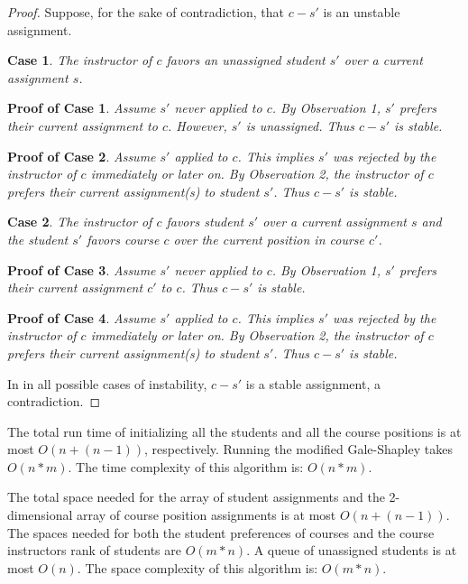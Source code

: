 \documentclass[11pt]{article}
\theoremstyle{definition}
\theoremstyle{plain}
\theoremstyle{indented-remark}
\newtheorem{case}{Case}
\theoremstyle{indented-proof}
\newtheorem*{proofofcase}{Proof of Case}
\begin{document}
\begin{proof}
Suppose, for the sake of contradiction, that $c - s'$ is an unstable assignment. 
\begin{case}
The instructor of $c$ favors an unassigned student $s'$ over a current assignment $s$.
\end{case}

\begin{proofofcase}
Assume $s'$ never applied to $c$. By Observation 1, $s'$ prefers their current assignment to $c$. However, $s'$ is unassigned. Thus $c - s'$ is stable.
\end{proofofcase}

\begin{proofofcase}
Assume $s'$ applied to $c$. This implies $s'$ was rejected by the instructor of $c$ immediately or later on. By Observation 2, the instructor of $c$ prefers their current assignment(s) to student $s'$. Thus $c - s'$ is stable.
\end{proofofcase}

\begin{case}
The instructor of $c$ favors student $s'$ over a current assignment $s$ and the student $s'$ favors course $c$ over the current position in course $c'$.
\end{case}

\begin{proofofcase}
Assume $s'$ never applied to $c$. By Observation 1, $s'$ prefers their current assignment $c'$ to $c$. Thus $c - s'$ is stable.
\end{proofofcase}

\begin{proofofcase}
Assume $s'$ applied to $c$. This implies $s'$ was rejected by the instructor of $c$ immediately or later on. By Observation 2, the instructor of $c$ prefers their current assignment(s) to student $s'$. Thus $c - s'$ is stable.
\end{proofofcase}

\noindent In in all possible cases of instability, $c - s'$ is a stable assignment, a contradiction.
\end{proof}

\noindent The total run time of initializing all the students and all the course positions is at most $O(n + (n-1))$, respectively. Running the modified Gale-Shapley takes $O(n*m)$. The time complexity of this algorithm is: $O(n*m)$. \newline

\noindent The total space needed for the array of student assignments and the 2-dimensional array of course position assignments is at most $O(n + (n - 1))$. The spaces needed for both the student preferences of courses and the course instructors rank of students are $O(m*n)$. A queue of unassigned students is at most $O(n)$. The space complexity of this algorithm is: $O(m*n)$.
\end{document}
